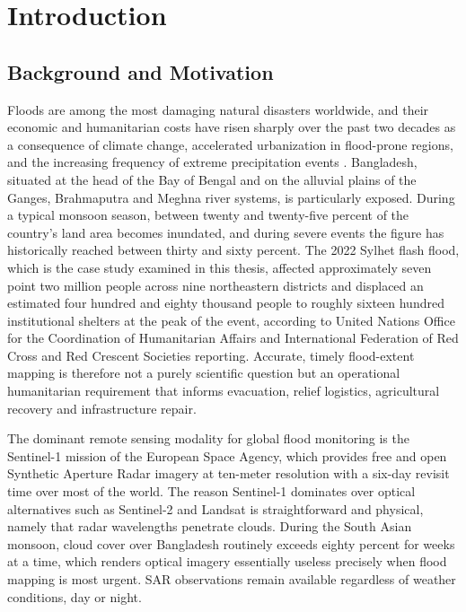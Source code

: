 \documentclass[11pt,a4paper,oneside]{report}
\begin{document}
\tableofcontents

\chapter{Introduction}
\label{chap:intro}

\section{Background and Motivation}

Floods are among the most damaging natural disasters worldwide, and their economic and humanitarian costs have risen sharply over the past two decades as a consequence of climate change, accelerated urbanization in flood-prone regions, and the increasing frequency of extreme precipitation events \cite{Hu2025GlobalFloods}. Bangladesh, situated at the head of the Bay of Bengal and on the alluvial plains of the Ganges, Brahmaputra and Meghna river systems, is particularly exposed. During a typical monsoon season, between twenty and twenty-five percent of the country's land area becomes inundated, and during severe events the figure has historically reached between thirty and sixty percent. The 2022 Sylhet flash flood, which is the case study examined in this thesis, affected approximately seven point two million people across nine northeastern districts and displaced an estimated four hundred and eighty thousand people to roughly sixteen hundred institutional shelters at the peak of the event, according to United Nations Office for the Coordination of Humanitarian Affairs and International Federation of Red Cross and Red Crescent Societies reporting. Accurate, timely flood-extent mapping is therefore not a purely scientific question but an operational humanitarian requirement that informs evacuation, relief logistics, agricultural recovery and infrastructure repair.

The dominant remote sensing modality for global flood monitoring is the Sentinel-1 mission of the European Space Agency, which provides free and open Synthetic Aperture Radar imagery at ten-meter resolution with a six-day revisit time over most of the world. The reason Sentinel-1 dominates over optical alternatives such as Sentinel-2 and Landsat is straightforward and physical, namely that radar wavelengths penetrate clouds. During the South Asian monsoon, cloud cover over Bangladesh routinely exceeds eighty percent for weeks at a time, which renders optical imagery essentially useless precisely when flood mapping is most urgent. SAR observations remain available regardless of weather conditions, day or night.
\end{document}
